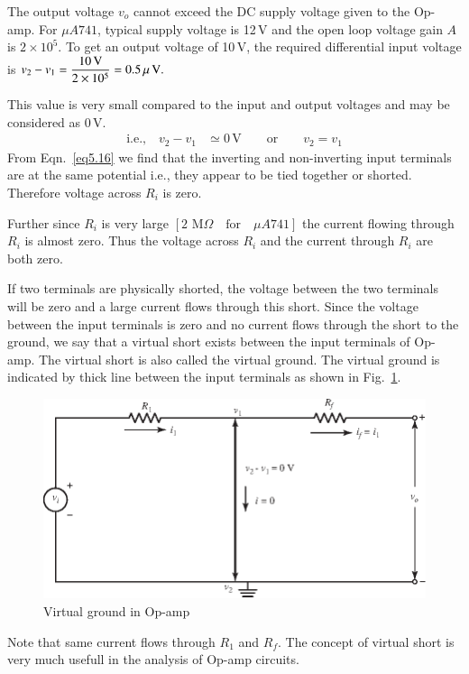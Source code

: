 \smallskip

The output voltage $v_{o}$ cannot exceed the DC supply voltage given to the Op-amp. For $\mu A741$, typical supply voltage is 12\,V and the open loop voltage gain $A$ is $2\times 10^{5}$. To get an output voltage of 10\,V, the required differential input voltage is
$
v_{2}-v_{1}=\dfrac{10\,\text{V}}{2\times 10^{5}}=0.5\,\mu\text{\,V}.
$

\smallskip

This value is very small compared to the input and output voltages and may be considered as 0\,V.
\begin{align}
\text{i.e.,}\quad v_{2}-v_{1} &\simeq 0\,\text{V}\qquad
\text{or}\qquad v_{2} = v_{1}\label{eq5.16}
\end{align}
From Eqn.~\eqref{eq5.16} we find that the inverting and non-inverting input terminals are at the same potential i.e., they appear to be tied together or shorted. Therefore voltage across $R_{i}$ is zero.

Further since $R_{i}$ is very large $[2\text{~M}\Omega\text{~~ for~~ }\mu A741]$ the current flowing through $R_{i}$ is almost zero. Thus the voltage across $R_{i}$ and the current through $R_{i}$ are both zero.

If two terminals are physically shorted, the voltage between the two terminals will be zero and a large current flows through this short. Since the voltage between the input terminals is zero and no current flows through the short to the ground, we say that a virtual short exists between the input terminals of Op-amp. The virtual short is also called the virtual ground. The virtual ground is indicated by thick line between the input terminals as shown in Fig.~\ref{fig5.8}.
\begin{figure}[H]
\centering
\includegraphics{chap4/S3-EE-06-012.eps}
\caption{Virtual ground in Op-amp}\label{fig5.8}
\end{figure}
Note that same current flows through $R_{1}$ and $R_{f}$. The concept of virtual short is very much usefull in the analysis of Op-amp circuits.

